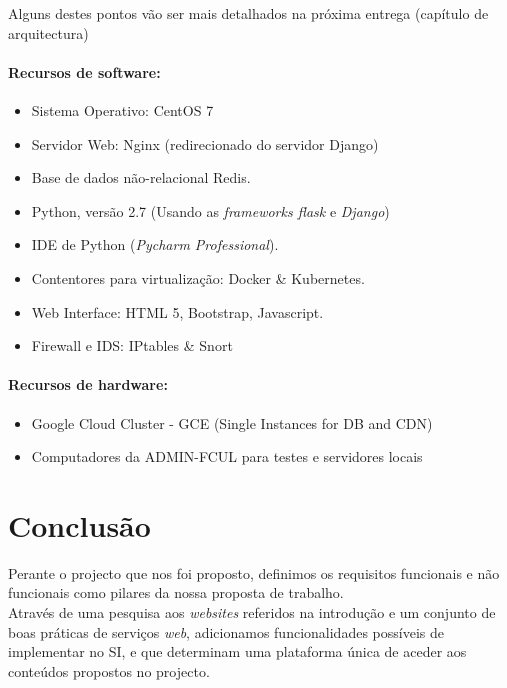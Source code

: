 \documentclass[12pt, a4paper, twoside]{report} %
\begin{document}
Alguns destes pontos vão ser mais detalhados na próxima entrega (capítulo de arquitectura)

\subsubsection{Recursos de software:}

\begin{itemize}
\item Sistema Operativo: CentOS 7
\item Servidor Web: Nginx (redirecionado do servidor Django)
\item Base de dados não-relacional Redis.
\item Python, versão 2.7 (Usando as \textit{frameworks flask} e \textit{Django})
\item IDE de Python (\textit{Pycharm Professional}).
\item Contentores para virtualização: Docker \& Kubernetes.
\item Web Interface: HTML 5, Bootstrap, Javascript.
\item Firewall e IDS: IPtables \& Snort
\end{itemize}


\subsubsection{Recursos de hardware:}
\begin{itemize}
\item Google Cloud Cluster - GCE (Single Instances for DB and CDN)
\item Computadores da ADMIN-FCUL para testes e servidores locais
\end{itemize}


\chapter{Conclusão}

Perante o projecto que nos foi proposto, definimos os requisitos funcionais e não funcionais como pilares da nossa proposta de trabalho.
\\

\noindent Através de uma pesquisa aos \textit {websites} referidos na introdução e um conjunto de boas práticas de serviços \textit {web}, adicionamos funcionalidades possíveis de implementar no SI, e que determinam uma plataforma única de aceder aos conteúdos propostos no projecto. \\
\end{document}
